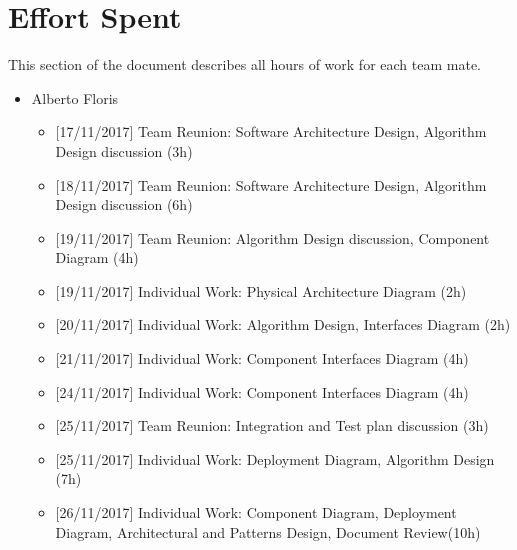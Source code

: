 \chapter{Effort Spent}

This section of the document describes all hours of work for each team mate.

\begin{itemize}
    
    \item Alberto Floris
        \begin{itemize}
            \item {[}17/11/2017{]} Team Reunion: Software Architecture Design, Algorithm Design discussion (3h)
            
            \item  {[}18/11/2017{]} Team Reunion: Software Architecture Design, Algorithm Design discussion (6h)
            
            \item {[}19/11/2017{]} Team Reunion: Algorithm Design discussion, Component Diagram (4h)
            
            \item {[}19/11/2017{]} Individual Work: Physical Architecture Diagram (2h)
            
            \item {[}20/11/2017{]} Individual Work: Algorithm Design,  Interfaces Diagram (2h)
            
            \item {[}21/11/2017{]} Individual Work: Component Interfaces Diagram (4h)
            
            \item {[}24/11/2017{]} Individual Work: Component Interfaces Diagram (4h)          

            \item {[}25/11/2017{]} Team Reunion: Integration and Test plan discussion (3h)
            
            \item {[}25/11/2017{]} Individual Work: Deployment Diagram, Algorithm Design (7h)
            
            \item {[}26/11/2017{]} Individual Work: Component Diagram, Deployment Diagram, Architectural and Patterns Design, Document Review(10h)
            
        \end{itemize}


\end{itemize}
